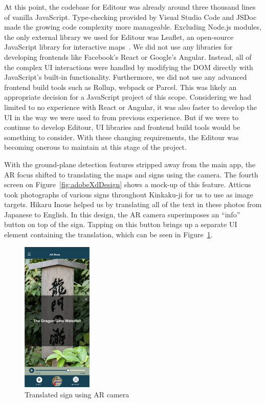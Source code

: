 \documentclass[a4paper, 10pt, american, titlepage]{article}
\begin{document}
At this point, the codebase for Editour was already around three thousand lines
of vanilla JavaScript. Type-checking provided by Visual Studio Code and JSDoc
made the growing code complexity more manageable. Excluding Node.js modules,
the only external library we used for Editour was Leaflet, an open-source
JavaScript library for interactive maps~\autocite{leafletjs}. We did not use
any libraries for developing frontends like Facebook's React or Google's
Angular. Instead, all of the complex UI interactions were handled by modifying
the DOM directly with JavaScript's built-in functionality. Furthermore, we did
not use any advanced frontend build tools such as Rollup, webpack or Parcel.
This was likely an appropriate decision for a JavaScript project of this scope.
Considering we had limited to no experience with React or Angular, it was also
faster to develop the UI in the way we were used to from previous experience.
But if we were to continue to develop Editour, UI libraries and frontend build
tools would be something to consider. With these changing requirements, the
Editour was becoming onerous to maintain at this stage of the project.

With the ground-plane detection features stripped away from the main app, the
AR focus shifted to translating the maps and signs using the camera. The fourth
screen on Figure~\ref{fig:adobeXdDesign} shows a mock-up of this feature.
Atticus took photographs of various signs throughout Kinkaku-ji for us to use as
image targets. Hikaru Inoue helped us by translating all of the text in these
photos from Japanese to English. In this design, the AR camera superimposes an
``info'' button on top of the sign. Tapping on this button brings up a separate
UI element containing the translation, which can be seen in
Figure~\ref{fig:signTranslation}.

\begin{figure}[h] \centering
    \includegraphics[width=0.3\textwidth]{sign-translation.png}
    \caption{Translated sign using AR camera}
    \label{fig:signTranslation}
\end{figure}
\end{document}
